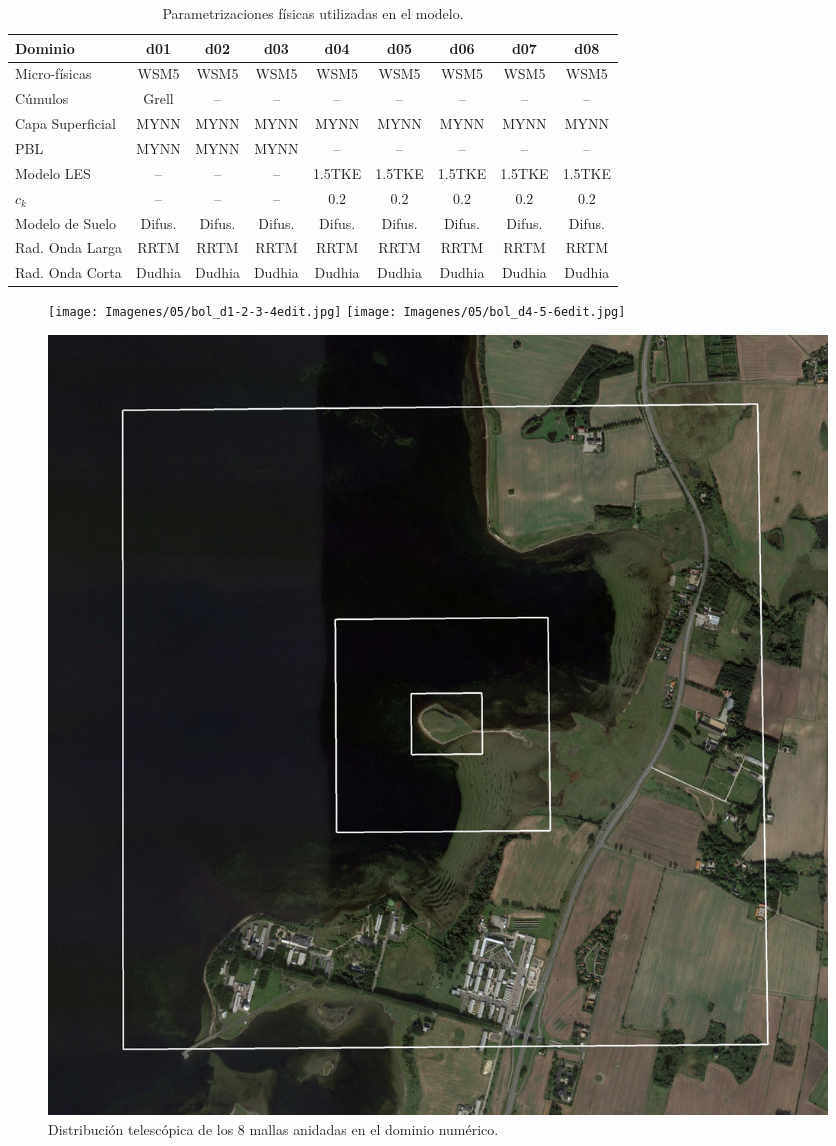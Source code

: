 \begin{table}[H]
	\caption{Parametrizaciones físicas utilizadas en el modelo.}\label{tab:05_param_bol}
	\centering\footnotesize
	\begin{tabular}{lcccccccc}
		\toprule
		Dominio 				& d01	&	d02	&	d03	&	d04	&	d05	&	d06 &	d07& d08\\
		\midrule
		Micro-físicas		 	& WSM5 & WSM5 & WSM5 &WSM5&WSM5&WSM5&WSM5& WSM5 \\
		Cúmulos			 		& Grell & -- & -- & -- & -- & -- & -- & -- \\ 
		Capa Superficial	 	& MYNN & MYNN & MYNN & MYNN & MYNN & MYNN & MYNN& MYNN\\
		PBL				 		& MYNN & MYNN & MYNN & -- & -- & -- & -- &--\\
		Modelo LES				 		& -- & -- & -- & 1.5TKE & 1.5TKE & 1.5TKE & 1.5TKE& 1.5TKE \\
		$c_k$				 		& -- & -- & -- & $0.2$ & $0.2$ & $0.2$ & $0.2$& $0.2$ \\
		Modelo de Suelo 		& Difus. & Difus. & Difus. & Difus. & Difus. & Difus. & Difus.& Difus. \\
		Rad. Onda Larga	& RRTM &RRTM&RRTM&RRTM&RRTM&RRTM&RRTM& RRTM\\
		Rad. Onda Corta	& Dudhia &Dudhia&Dudhia&Dudhia&Dudhia&Dudhia&Dudhia& Dudhia\\
		\bottomrule
	\end{tabular}
\end{table}

\begin{figure}[H]
	\centering
	\texttt{[image: Imagenes/05/bol\_d1-2-3-4edit.jpg]}
	\texttt{[image: Imagenes/05/bol\_d4-5-6edit.jpg]}
	
	\bigskip
	\includegraphics[width=0.6\linewidth,page=1,trim={5mm 3mm 3mm 3mm},clip,frame]{Imagenes/05/bol_d6-7-8edit.jpg}%
	
	\caption{Distribución telescópica de los 8 mallas anidadas en el dominio numérico.}
	\label{fig:05_dom_bol}
\end{figure}



